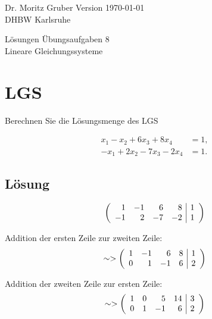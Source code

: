 




\vspace*{-20mm}
{
	\color{dhbwGray}
	Dr. Moritz Gruber	\hfill Version \today\\
	DHBW Karlsruhe\\
}

\vspace{10mm}
\begin{center}
	{
		\color{lightBlue}
		{ \LARGE L\"osungen Übungsaufgaben 8}\\[3mm]
		{\Large Lineare Gleichungssysteme}
	}
\end{center}

\vspace{5mm}



\section{LGS}

Berechnen Sie die L\"osungsmenge des LGS

\begin{align*}
	x_1 - x_2 + 6x_3 + 8x_4 &= 1,\\
	-x_1 +2x_2 - 7x_3-2x_4 &= 1.
\end{align*}

\subsection*{L\"osung}

$$
	\left(
		\begin{array}{rrrr | r}
			1	&-1	&6	&8	&1	\\
			-1	&2	&-7	&-2	&1
		\end{array}
	\right)
$$

Addition der ersten Zeile zur zweiten Zeile:
$$
	\sim>
	\left(
		\begin{array}{rrrr | r}
			1	&-1	&6	&8	&1	\\
			0	&1	&-1	&6	&2
		\end{array}
	\right)
$$

Addition der zweiten Zeile zur ersten Zeile:
$$
	\sim>
	\left(
		\begin{array}{rrrr | r}
			1	&0	&5	&14	&3	\\
			0	&1	&-1	&6	&2
		\end{array}
	\right)
$$

